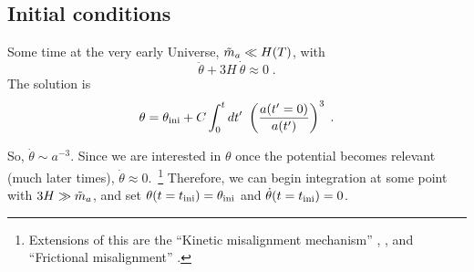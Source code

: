 \documentclass[10pt,utf8,compress,xcolor=dvipsnames]{beamer}
\begin{document}
\subsection{Initial conditions}
\begin{frame}{\insertsubsectionhead}
	Some time at the very early Universe, $\tilde m_{a}{} \ll H(T)$, with
	\begin{equation*}
		\ddot{\theta}  + 3H \ \dot{\theta} \approx 0 \;.
	\end{equation*}	
	The solution is 
	$$
	\theta = \theta_{\rm ini}{} + C \displaystyle \int_{0}^t d t' \ \left(  \dfrac{a(t'=0)}{a(t')}  \right)^3 \;.
	$$
	
	So, $\dot{\theta} \sim a^{-3}$. Since we are interested in $\theta$ once the potential becomes relevant (\ie much later times), $\dot{\theta} \approx 0$.~\footnote{\fontF Extensions of this are
		the ``Kinetic misalignment mechanism'' 			
		,
		,
		and ``Frictional misalignment''
		.
	}
	Therefore, we can begin integration at some point with $3H \gg \tilde m_{a}{}$, and set $\theta(t=t_{\rm ini}{}) = \theta_{\rm ini}{}$ and $\dot \theta(t=t_{\rm ini}{}) = 0$. 
	
\end{frame}
\end{document}
